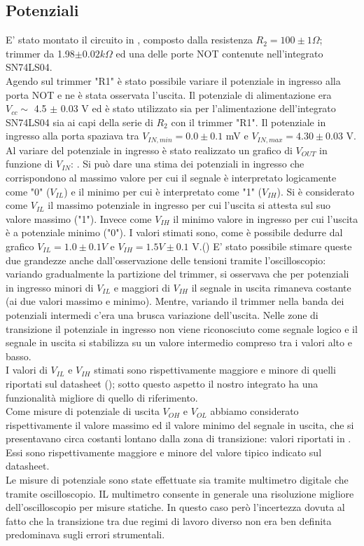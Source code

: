 \subsection{Potenziali}
E' stato montato il circuito in , composto dalla resistenza $R_{2}=100 \pm 1 \Omega$; trimmer da 1.98$\pm 0.02 k\Omega$ ed una delle porte NOT contenute nell'integrato SN74LS04.\\
 Agendo sul trimmer "R1" è stato possibile variare il potenziale in ingresso alla porta NOT e ne è stata osservata l'uscita. Il potenziale di alimentazione era $V_{cc} \sim$ 4.5 $\pm$ 0.03 V  ed è stato utilizzato sia per l'alimentazione dell'integrato SN74LS04 sia ai capi della serie di $R_2$ con il trimmer "R1". Il potenziale in ingresso alla porta spaziava tra $V_{IN,min}=0.0 \pm 0.1$ mV e $V_{IN,max}=4.30 \pm 0.03$ V. Al variare del potenziale in ingresso è stato realizzato un grafico di $V_{OUT}$ in funzione di $V_{IN}$: . Si può dare una stima dei potenziali in ingresso che corrispondono al massimo valore per cui il segnale è interpretato logicamente come "0" ($V_{IL}$) e il minimo per cui è interpretato come "1" ($V_{IH}$). Si è considerato come $V_{IL}$ il massimo potenziale in ingresso per cui l'uscita si attesta sul suo valore massimo ("1"). Invece come $V_{IH}$ il minimo valore in ingresso per cui l'uscita è a potenziale minimo ("0"). I valori stimati sono, come è possibile dedurre dal grafico   $V_{IL}=1.0 \pm 0.1 V$ e $V_{IH}=1.5V \pm 0.1$ V.()
 E' stato possibile stimare queste due grandezze anche dall'osservazione delle tensioni tramite l'oscilloscopio: variando gradualmente la partizione del trimmer, si osservava che per potenziali in ingresso minori di $V_{IL}$ e maggiori di $V_{IH}$ il segnale in uscita rimaneva costante (ai due valori massimo e minimo). Mentre, variando il trimmer nella banda dei potenziali intermedi c'era una brusca variazione dell'uscita. Nelle zone di transizione il potenziale in ingresso  non viene riconosciuto come segnale logico e il segnale in uscita si stabilizza su un valore intermedio compreso tra i valori alto e basso.\\ 
 I valori di  $V_{IL}$ e $V_{IH}$ stimati sono rispettivamente maggiore e minore di quelli riportati sul datasheet (); sotto questo aspetto il nostro integrato ha una funzionalità migliore di quello di riferimento. \\
Come misure di potenziale di uscita $V_{OH}$ e $V_{OL}$ abbiamo considerato rispettivamente il valore massimo ed il valore minimo del segnale in uscita, che si presentavano circa costanti lontano dalla zona di transizione: valori riportati in .  Essi sono rispettivamente maggiore e minore del valore tipico indicato sul datasheet.\\
Le misure di potenziale sono state effettuate sia tramite multimetro digitale che tramite oscilloscopio. IL multimetro consente in generale una risoluzione migliore dell'oscilloscopio per misure statiche. In questo caso però l'incertezza dovuta al fatto che la transizione tra due regimi di lavoro diverso non era ben definita predominava sugli errori strumentali.
